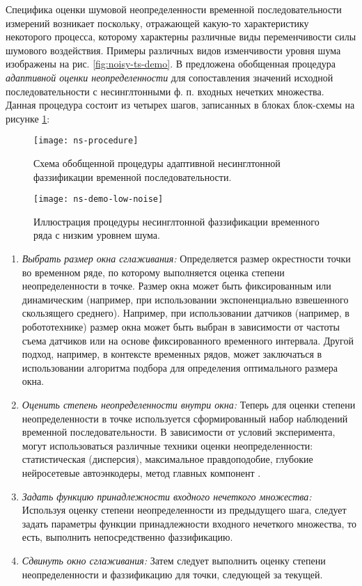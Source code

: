 Специфика оценки шумовой неопределенности временной последовательности измерений возникает поскольку, отражающей какую-то характеристику некоторого процесса, которому характерны различные виды переменчивости силы шумового воздействия. Примеры различных видов изменчивости уровня шума изображены на рис. \cref{fig:noisy-ts-demo}. В \cite{} предложена обобщенная процедура \textit{адаптивной оценки неопределенности} для сопоставления значений исходной последовательности с несинглтонными ф. п. входных нечетких множества. Данная процедура состоит из четырех шагов, записанных в блоках блок-схемы на рисунке \cref{fig:ns-procedure}:

\begin{figure}[h]
	\centering
	\texttt{[image: ns-procedure]}
	\caption{Схема обобщенной процедуры адаптивной несинглтонной фаззификации временной последовательности.}
	\label{fig:ns-procedure}
\end{figure}

\begin{figure}[thb]
\centering
\texttt{[image: ns-demo-low-noise]}
\caption{Иллюстрация процедуры несинглтонной фаззификации временного ряда с низким уровнем шума.}
\label{fig:ns-demo-low-noise}
\end{figure}

\begin{enumerate}
	\item \textit{Выбрать размер окна сглаживания:} Определяется размер окрестности точки во временном ряде, по которому выполняется оценка степени неопределенности в точке. Размер окна может быть фиксированным или динамическим (например, при использовании экспоненциально взвешенного скользящего среднего). Например, при использовании датчиков (например, в робототехнике)	размер окна может быть выбран в зависимости от частоты съема датчиков или на основе фиксированного временного интервала. Другой подход, например, в контексте	временных рядов, может заключаться в использовании алгоритма подбора для определения оптимального размера окна.
	\item \textit{Оценить степень неопределенности внутри окна:} Теперь для оценки степени неопределенности в точке используется сформированный набор наблюдений временной последовательности. В зависимости от условий эксперимента, могут использоваться различные техники оценки неопределенности: статистическая (дисперсия), максимальное правдоподобие, глубокие нейросетевые автоэнкодеры, метод главных компонент . 
	\item \textit{Задать функцию принадлежности входного нечеткого множества:} Используя оценку степени неопределенности из предыдущего шага, следует задать параметры функции принадлежности входного нечеткого множества, то есть, выполнить непосредственно фаззификацию.
	\item \textit{Сдвинуть окно сглаживания:} Затем следует выполнить оценку степени неопределенности и фаззификацию для точки, следующей за текущей.
\end{enumerate}

